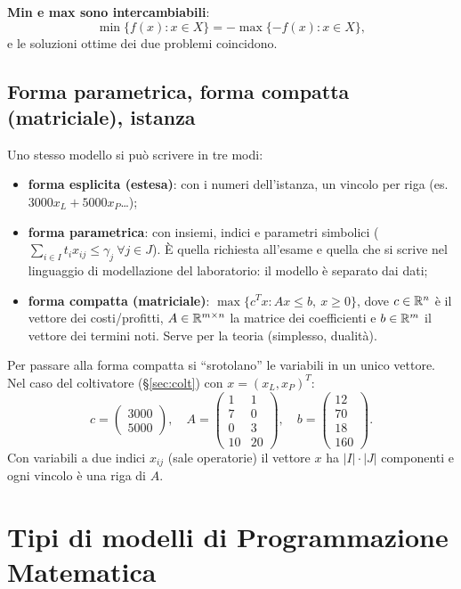 \textbf{Min e max sono intercambiabili}:
\[\min\{f(x):x\in X\}=-\max\{-f(x):x\in X\},\]
e le soluzioni ottime dei due problemi coincidono.

\subsection{Forma parametrica, forma compatta (matriciale), istanza}

Uno stesso modello si può scrivere in tre modi:
\begin{itemize}[nosep]
  \item \textbf{forma esplicita (estesa)}: con i numeri dell'istanza, un vincolo per riga (es.\ $3000x_L+5000x_P$\dots);
  \item \textbf{forma parametrica}: con insiemi, indici e parametri simbolici ($\sum_{i\in I}t_ix_{ij}\le\gamma_j\ \forall j\in J$). È quella richiesta all'esame e quella che si scrive nel linguaggio di modellazione del laboratorio: il modello è separato dai dati;
  \item \textbf{forma compatta (matriciale)}: $\max\{c^Tx: Ax\le b,\ x\ge0\}$, dove $c\in\mathbb{R}^n$ è il vettore dei costi/profitti, $A\in\mathbb{R}^{m\times n}$ la matrice dei coefficienti e $b\in\mathbb{R}^m$ il vettore dei termini noti. Serve per la teoria (simplesso, dualità).
\end{itemize}
Per passare alla forma compatta si ``srotolano'' le variabili in un unico vettore. Nel caso del coltivatore (\S\ref{sec:colt}) con $x=(x_L,x_P)^T$:
\[
c=\begin{pmatrix}3000\\5000\end{pmatrix},\quad
A=\begin{pmatrix}1&1\\7&0\\0&3\\10&20\end{pmatrix},\quad
b=\begin{pmatrix}12\\70\\18\\160\end{pmatrix}.
\]
Con variabili a due indici $x_{ij}$ (sale operatorie) il vettore $x$ ha $|I|\cdot|J|$ componenti e ogni vincolo è una riga di $A$.

\section{Tipi di modelli di Programmazione Matematica}

